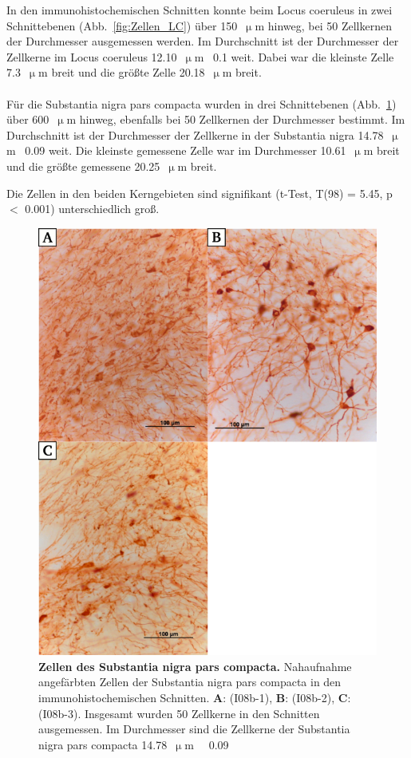 \documentclass[12pt,a4paper,pdftex]{article}
\newcommand{\rpm}{\raisebox{.2ex}{$\scriptstyle\pm$} }
\begin{document}
In den immunohistochemischen Schnitten konnte beim Locus coeruleus  in zwei Schnittebenen (Abb.~\ref{fig:Zellen_LC}) über 150~$\upmu$m hinweg, bei 50 Zellkernen der Durchmesser ausgemessen werden. Im Durchschnitt ist der Durchmesser der Zellkerne im Locus coeruleus 12.10~$\upmu$m~\rpm0.1 weit. Dabei war die kleinste Zelle 7.3~$\upmu$m breit und die größte Zelle 20.18~$\upmu$m breit.
\\
\\
Für die Substantia nigra pars compacta  wurden in drei Schnittebenen (Abb.~\ref{fig:Zellen_SNC}) über 600~$\upmu$m hinweg, ebenfalls bei 50 Zellkernen der Durchmesser bestimmt. Im Durchschnitt ist der Durchmesser der Zellkerne in der Substantia nigra 14.78~$\upmu$m~\rpm0.09 weit. Die kleinste gemessene Zelle war im Durchmesser 10.61~$\upmu$m breit und die größte gemessene 20.25~$\upmu$m breit.

Die Zellen in den beiden Kerngebieten sind signifikant (t-Test, T(98) = 5.45, p $<$ 0.001) unterschiedlich groß.

\begin{figure}[H]
    \centering
    \includegraphics{pictures/Bilder_monoamine_systeme/Zellen_SNC.png}
    \caption[Zellen des Substantia nigra pars compacta]{\textbf{Zellen des Substantia nigra pars compacta.} Nahaufnahme angefärbten Zellen der Substantia nigra pars compacta in den immunohistochemischen Schnitten. \textbf{A}: (I08b-1), \textbf{B}: (I08b-2), \textbf{C}: (I08b-3). Insgesamt wurden 50 Zellkerne in den Schnitten ausgemessen. Im Durchmesser sind die Zellkerne der Substantia nigra pars compacta 14.78~$\upmu$m~\rpm~0.09}
    \label{fig:Zellen_SNC}
\end{figure}
\end{document}
